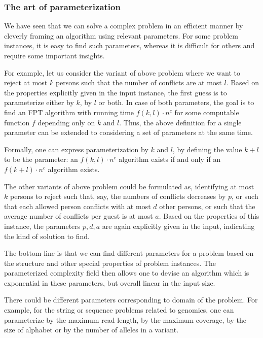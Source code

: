 \subsubsection{The art of parameterization}
We have seen that we can solve a complex problem in an efficient manner by cleverly framing an algorithm using relevant parameters.
For some problem instances, it is easy to find such parameters, whereas it is difficult for others and require some important insights.

For example, let us consider the variant of above problem where we want to reject at most $k$ persons
such that the number of conflicts are at most $l$.
Based on the properties explicitly given in the input instance, the first guess is to parameterize either by $k$, by $l$ or both. 
In case of both parameters, the goal is to find an FPT algorithm with running time $f(k,l) \cdot n^c$ for some computable function $f$
depending only on $k$ and $l$. Thus, the above definition for a single parameter can be extended to considering a set of parameters at the same time.

\begin{definition}
Formally, one can express parameterization by $k$ and $l$, by defining the value $k+l$ to be the parameter:
an $f(k,l)\cdot n^c$ algorithm exists if and only if an $f(k+l) \cdot n^c$ algorithm exists.
\end{definition}

The other variants of above problem could be formulated as, identifying at most $k$ persons to reject such that,
say, the numbers of conflicts decreases by $p$, or such that each allowed person conflicts with at most $d$ other persons,
or such that the average number of conflicts per guest is at most $a$. Based on the properties of this instance, the parameters $p, d, a$ are again explicitly given in the input,
indicating the kind of solution to find. 

The bottom-line is that we can find different parameters for a problem based on the structure and other special properties of problem instances.
The parameterized complexity field then allows one to devise an algorithm which is exponential in these parameters, but overall linear in the input size.

There could be different parameters corresponding to domain of the problem. For example, 
for the string or sequence problems related to genomics, one can parameterize by the maximum read length, by the maximum coverage,
by the size of alphabet or by the number of alleles in a variant.

